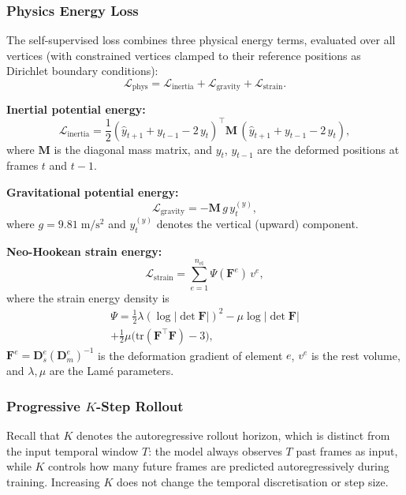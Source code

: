 \documentclass[10pt,twocolumn]{article}
\begin{document}
\subsubsection{Physics Energy Loss}

The self-supervised loss combines three physical energy terms, evaluated over all vertices (with constrained vertices clamped to their reference positions as Dirichlet boundary conditions):
\begin{equation}\label{eq:phys_loss}
    \mathcal{L}_{\mathrm{phys}} = \mathcal{L}_{\mathrm{inertia}} + \mathcal{L}_{\mathrm{gravity}} + \mathcal{L}_{\mathrm{strain}}.
\end{equation}

\textbf{Inertial potential energy:}
\begin{equation}
    \mathcal{L}_{\mathrm{inertia}} = \frac{1}{2} (\hat{y}_{t+1} + y_{t-1} - 2\,y_t)^\top \mathbf{M}\, (\hat{y}_{t+1} + y_{t-1} - 2\,y_t),
\end{equation}
where $\mathbf{M}$ is the diagonal mass matrix, and $y_t$, $y_{t-1}$ are the deformed positions at frames $t$ and $t-1$.

\textbf{Gravitational potential energy:}
\begin{equation}
    \mathcal{L}_{\mathrm{gravity}} = -\mathbf{M}\, g\, y_t^{(y)},
\end{equation}
where $g = 9.81\;\mathrm{m/s^2}$ and $y_t^{(y)}$ denotes the vertical (upward) component.

\textbf{Neo-Hookean strain energy:}
\begin{equation}
    \mathcal{L}_{\mathrm{strain}} = \sum_{e=1}^{n_{\mathrm{el}}} \Psi(\mathbf{F}^e)\, v^e,
\end{equation}
where the strain energy density is
\begin{multline}
    \Psi = \tfrac{1}{2}\lambda(\log|\!\det\mathbf{F}|)^2
    - \mu\log|\!\det\mathbf{F}| \\
    + \tfrac{1}{2}\mu\big(\mathrm{tr}(\mathbf{F}^\top\!\mathbf{F}) - 3\big),
\end{multline}
$\mathbf{F}^e = \mathbf{D}_s^e (\mathbf{D}_m^e)^{-1}$ is the deformation gradient of element $e$, $v^e$ is the rest volume, and $\lambda, \mu$ are the Lam\'{e} parameters.

\subsubsection{Progressive $K$-Step Rollout}

Recall that $K$ denotes the autoregressive rollout horizon, which is distinct from the input temporal window $T$: the model always observes $T$ past frames as input, while $K$ controls how many future frames are predicted autoregressively during training. Increasing $K$ does not change the temporal discretisation or step size.
\end{document}
